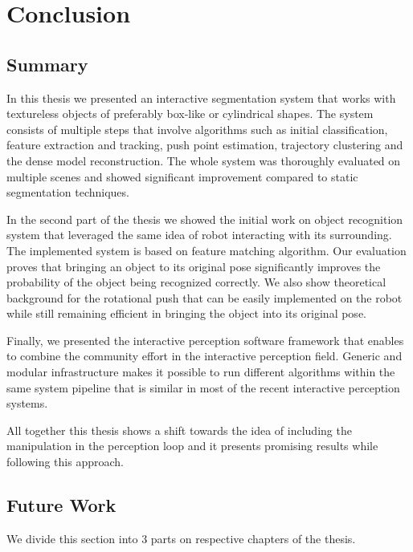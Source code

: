 \chapter{Conclusion}
\label{chapter:conclusion}

\section{Summary}

In this thesis we presented an interactive segmentation system that works with textureless objects of preferably box-like or cylindrical shapes. The system consists of multiple steps that involve algorithms such as initial classification, feature extraction and tracking, push point estimation, trajectory clustering and the dense model reconstruction. The whole system was thoroughly evaluated on multiple scenes and showed significant improvement compared to static segmentation techniques.

In the second part of the thesis we showed the initial work on object recognition system that leveraged the same idea of robot interacting with its surrounding. The implemented system is based on feature matching algorithm. Our evaluation proves that bringing an object to its original pose significantly improves the probability of the object being recognized correctly. We also show theoretical background for the rotational push that can be easily implemented on the robot while still remaining efficient in bringing the object into its original pose. 

Finally, we presented the interactive perception software framework that enables to combine the community effort in the interactive perception field. Generic and modular infrastructure makes it possible to run different algorithms within the same system pipeline that is similar in most of the recent interactive perception systems.

All together this thesis shows a shift towards the idea of including the manipulation in the perception loop and it presents promising results while following this approach. 


\section{Future Work}
We divide this section into 3 parts on respective chapters of the thesis.

